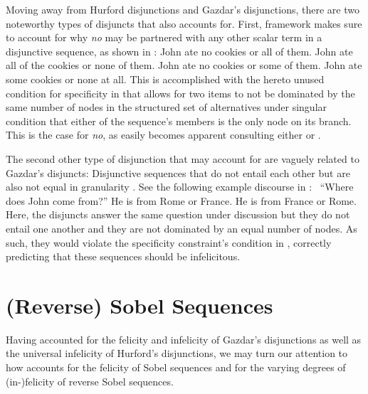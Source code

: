Moving away from Hurford disjunctions and Gazdar's disjunctions, there are two noteworthy types of disjuncts that \textcite{Ippolito2020} also accounts for. First,  framework makes sure to account for why \textit{no} may be partnered with any other scalar term in a disjunctive sequence, as shown in :
\pex\label{ex:ippolito-showoff}
\a John ate no cookies or all of them.
\a John ate all of the cookies or none of them.
\a John ate no cookies or some of them.
\a John ate some cookies or none at all.
\xe
This is accomplished with the hereto unused condition for specificity in  that allows for two items to not be dominated by the same number of nodes in the structured set of alternatives under singular condition that either of the sequence's members is the only node on its branch. This is the case for \textit{no}, as easily becomes apparent consulting either  or .

The second other type of disjunction that \textcite{Ippolito2020} may account for are vaguely related to Gazdar's disjuncts: Disjunctive sequences that do not entail each other but are also not equal in granularity \parencite[p.~648, Footnote~12]{Ippolito2020}. See the following example discourse in :
\pex\label{ex:ippolito-showoff2}
~\enquote{Where does John come from?}
\a {}He is from Rome or France.
\a {}He is from France or Rome.
\xe
Here, the disjuncts answer the same question under discussion but they do not entail one another and they are not dominated by an equal number of nodes. As such, they would violate the specificity constraint's condition in , correctly predicting that these sequences should be infelicitous.

\section{(Reverse) Sobel Sequences}
Having accounted for the felicity and infelicity of Gazdar's disjunctions as well as the universal infelicity of Hurford's disjunctions, we may turn our attention to how \textcite{Ippolito2020} accounts for the felicity of Sobel sequences and for the varying degrees of (in-)felicity of reverse Sobel sequences.

